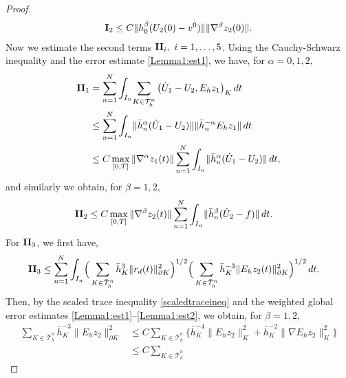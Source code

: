 \documentclass{amsart}
\numberwithin{equation}{section}
\theoremstyle{definition}
\begin{document}
\begin{proof}
\begin{equation}
  \begin{split}
   {\rm{\bf I}}_2
    \le C \|h_0^\beta(U_2(0)-v^0)\| \|\nabla^\beta z_2(0)\|.
  \end{split}
\end{equation}
Now we estimate the second terms ${\rm{\bf II}}_i,\ i=1,\dots,5$. 
Using the Cauchy-Schwarz inequality and the error estimate
\eqref{Lemma1:est1}, we have, for $\alpha=0,1,2$,
\begin{equation}   \label{II1}
  \begin{split}
    {\rm{\bf II}}_1
    &=\sum_{n=1}^N\int_{I_n}\!\sum_{K\in\bar{\mathcal T}_h^n}
     \big(\dot U_1-U_2,E_hz_1\big)_K \,dt\\
    &\le \sum_{n=1}^N\int_{I_n}\!
     \| \bar h_n^\alpha(\dot U_1-U_2)\| \| \bar h_n^{-\alpha}E_hz_1\|\,dt\\
    &\le C \max_{[0,T]}\|\nabla^\alpha z_1(t)\|
    \sum_{n=1}^N\int_{I_n}\!\| \bar h_n^\alpha(\dot U_1-U_2)\|\,dt,
  \end{split}
\end{equation}
and similarly we obtain, for $\beta=1,2$,
\begin{equation}   \label{II2}
  \begin{split}
    {\rm{\bf II}}_2
    &\le C \max_{[0,T]}\|\nabla^\beta z_2(t)\|
    \sum_{n=1}^N\int_{I_n}\!\| \bar h_n^\beta(\dot U_2-f)\|\,dt.
  \end{split}
\end{equation}
For ${\rm{\bf II}}_3$, we first have,
\begin{equation*}
  \begin{split}
    &{\rm{\bf II}}_3
     \le \sum_{n=1}^N\int_{I_n}\!
     \Big(\sum_{K\in\bar{\mathcal T}_h^n}
       \bar h_K^3\|r_d(t)\|_{\partial K}^2\Big)^{1/2}
     \Big(\sum_{K\in\bar{\mathcal T}_h^n}\bar h_K^{-3}
       \|E_hz_2(t)\|_{\partial K}^2\Big)^{1/2} \,dt.
  \end{split}
\end{equation*}
Then, by the scaled trace inequality \eqref{scaledtraceineq} 
and the weighted global error estimates 
\eqref{Lemma1:est1}--\eqref{Lemma1:est2},
we obtain, for $\beta=1,2$,
\begin{equation*}  
  \begin{split}
     \sum_{K\in\bar{\mathcal T}_h^n}\bar h_K^{-3}
       \|E_hz_2\|_{\partial K}^2
     &\le C \sum_{K\in\bar{\mathcal T}_h^n}\big\{
       \bar h_K^{-4}\|E_hz_2\|_K^2
       +\bar h_K^{-2}\|\nabla E_hz_2\|_K^2\big\}\\
     &\le C \sum_{K\in\bar{\mathcal T}_h^n} 

\end{split}
\end{equation*}
\end{proof}
\end{document}
